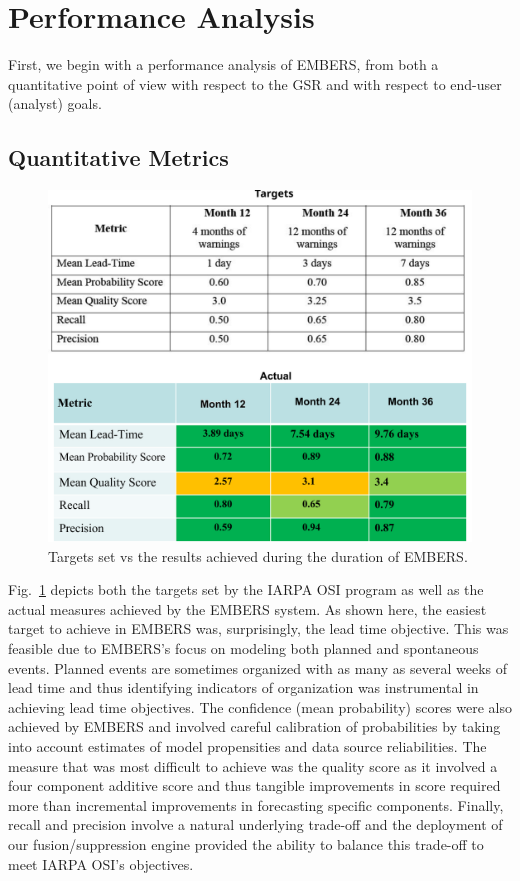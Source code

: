 \section{Performance Analysis}
First, we begin with a performance analysis of EMBERS, from both a quantitative
point of view with respect to the GSR and with respect to end-user (analyst) goals.
\subsection{Quantitative Metrics}
\begin{figure}
\includegraphics[width=0.8\columnwidth]{figures/cu/performance_tb1}
\caption{Targets set vs the results achieved during the duration of EMBERS.}
\label{quant}
\end{figure}
Fig.~\ref{quant} depicts both the targets set by the IARPA OSI program as well as the
actual measures achieved by the EMBERS system. As shown here, the easiest target to achieve
in EMBERS was, surprisingly, the lead time objective. This was feasible due to EMBERS's focus on modeling
both planned and spontaneous events. Planned events are sometimes organized with as many as several weeks
of lead time and thus identifying indicators of organization was instrumental in achieving
lead time objectives. The confidence (mean probability) scores were also achieved by EMBERS and involved
careful calibration of probabilities by taking into account estimates of
model propensities and data source reliabilities. The measure that was most difficult to achieve
was the quality score as it involved a four component additive score and thus tangible improvements in
score required more than incremental improvements in forecasting specific components. Finally, recall
and precision involve a natural underlying trade-off and the deployment of our fusion/suppression
engine provided the ability to balance this trade-off to meet IARPA OSI's objectives.

